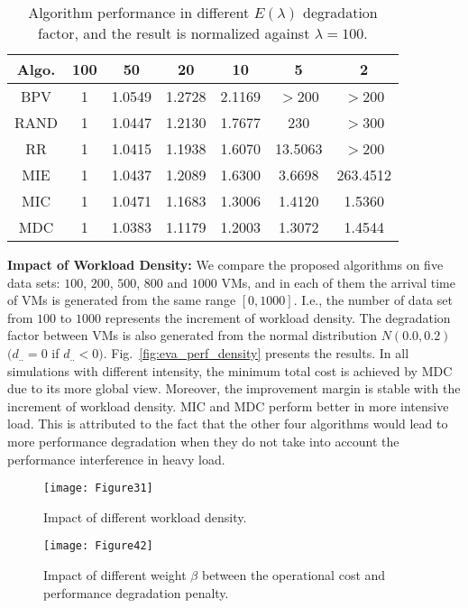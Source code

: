 \documentclass[10pt,journal]{IEEEtran}
\begin{document}
\begin{table}[htbp]
\centering
\caption{\label{tb:eva_perf_degFactorE}Algorithm performance in different $E(\lambda)$ degradation factor, and the result is normalized against $\lambda=100$.}
\begin{tabular}{c|c|c|c|c|c|c}\hline\hline
Algo.&100&50&20&10&5&2\\\hline
BPV&1&1.0549&1.2728&2.1169&${>}$200&${>}$200\\
RAND&1&1.0447&1.2130&1.7677&230&${>}$300\\
RR&1&1.0415&1.1938&1.6070&13.5063&${>}$200\\
MIE&1&1.0437&1.2089&1.6300&3.6698&263.4512\\\hline
MIC&1&1.0471&1.1683&1.3006&1.4120&1.5360\\
MDC&1&1.0383&1.1179&1.2003&1.3072&1.4544\\\hline\hline
\end{tabular}
\end{table}

\textbf{Impact of Workload Density:} We compare the proposed algorithms on five data sets: $100$, $200$, $500$, $800$ and $1000$ VMs, and in each of them the arrival time of VMs is generated from the same range $[0,1000]$. I.e., the number of data set from $100$ to $1000$ represents the increment of workload density. The degradation factor between VMs is also generated from the normal distribution $N(0.0,0.2)$ $(d_{..}=0$ if $d_{..}<0)$. Fig.~\ref{fig:eva_perf_density} presents the results. In all simulations with different intensity, the minimum total cost is achieved by MDC due to its more global view. Moreover, the improvement margin is stable with the increment of workload density. MIC and MDC perform better in more intensive load. This is attributed to the fact that the other four algorithms would lead to more performance degradation when they do not take into account the performance interference in heavy load.
\begin{figure}[htbp]
\centering
\texttt{[image: Figure31]}
\centering
\caption{\label{fig:eva_perf_density}Impact of different workload density.}\label{fig:graph}
\end{figure}
\begin{figure*}[htbp]
\centering
\texttt{[image: Figure42]}
\centering
\caption{\label{fig:eva_perf_weight}Impact of different weight $\beta$ between the operational cost and performance degradation penalty.}\label{fig:graph}
\end{figure*}
\end{document}
